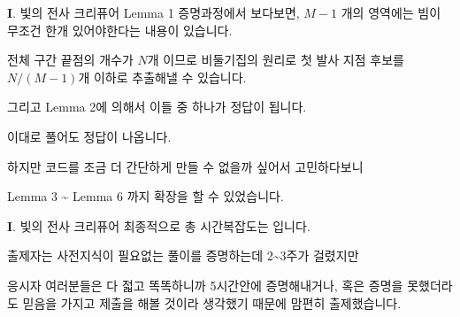 \begin{frame}{\textbf{I}. 빛의 전사 크리퓨어}
    \textcolor{ucpc-orange}{Lemma 1} 증명과정에서 보다보면, $M-1$ 개의 영역에는 빔이 무조건 한개 있어야한다는 내용이 있습니다.

    전체 구간 끝점의 개수가 $N$개 이므로 비둘기집의 원리로 첫 발사 지점 후보를 $N/(M-1)$개 이하로 추출해낼 수 있습니다.
    
    그리고 \textcolor{ucpc-orange}{Lemma 2}에 의해서 이들 중 하나가 정답이 됩니다.
    
    이대로 풀어도 정답이 나옵니다.
    
    \vspace{18pt}
    
    하지만 코드를 조금 더 간단하게 만들 수 없을까 싶어서 고민하다보니
    
    \textcolor{ucpc-orange}{Lemma 3} \~{} \textcolor{ucpc-orange}{Lemma 6} 까지 확장을 할 수 있었습니다.
\end{frame}

\begin{frame}{\textbf{I}. 빛의 전사 크리퓨어}
    최종적으로 총 시간복잡도는 입니다.
    
    \vspace{36pt}
    
    출제자는 사전지식이 필요없는 풀이를 증명하는데 2\~{}3주가 걸렸지만
    
    응시자 여러분들은 다 젋고 똑똑하니까 5시간안에 증명해내거나, 혹은 증명을 못했더라도 믿음을 가지고 제출을 해볼 것이라 생각했기 때문에 맘편히 출제했습니다.
\end{frame}